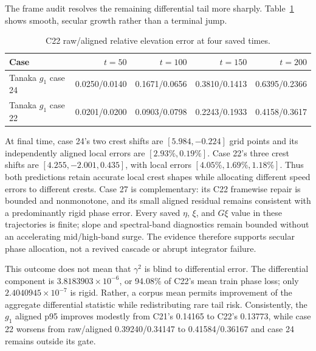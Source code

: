 \documentclass[11pt]{article}
\begin{document}
The frame audit resolves the remaining differential tail more sharply.
Table~\ref{tab:c22-differential-frames} shows smooth, secular growth rather
than a terminal jump.
\begin{table}[htbp]
\centering
\small
\begin{tabular}{lrrrr}
\toprule
Case & $t=50$ & $t=100$ & $t=150$ & $t=200$ \\
\midrule
Tanaka $g_1$ case 24 & 0.0250/0.0140 & 0.1671/0.0656 & 0.3810/0.1413 & 0.6395/0.2366 \\
Tanaka $g_1$ case 22 & 0.0201/0.0200 & 0.0903/0.0798 & 0.2243/0.1933 & 0.4158/0.3617 \\
\bottomrule
\end{tabular}
\caption{C22 raw/aligned relative elevation error at four saved times.}
\label{tab:c22-differential-frames}
\end{table}
At final time, case 24's two crest shifts are
\([5.984,-0.224]\) grid points and its independently aligned local errors are
\([2.93\%,0.19\%]\).  Case 22's three crest shifts are
\([4.255,-2.001,0.435]\), with local errors
\([4.05\%,1.69\%,1.18\%]\).  Thus both predictions retain accurate local crest
shapes while allocating different speed errors to different crests.  Case 27
is complementary: its C22 framewise repair is bounded and nonmonotone, and its
small aligned residual remains consistent with a predominantly rigid phase
error.  Every saved \(\eta\), \(\xi\), and \(G\xi\) value in these trajectories
is finite; slope and spectral-band diagnostics remain bounded without an
accelerating mid/high-band surge.  The evidence therefore supports secular
phase allocation, not a revived cascade or abrupt integrator failure.

This outcome does not mean that \(\gamma^2\) is blind to differential error.
The differential component is \(3.8183903\times10^{-6}\), or 94.08\% of C22's
mean train phase loss; only \(2.4040945\times10^{-7}\) is rigid.  Rather, a
corpus mean permits improvement of the aggregate differential statistic while
redistributing rare tail risk.  Consistently, the \(g_1\) aligned p95 improves
modestly from C21's 0.14165 to C22's 0.13773, while case 22 worsens from
raw/aligned 0.39240/0.34147 to 0.41584/0.36167 and case 24 remains outside its
gate.
\end{document}
